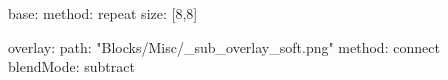 base:
  method: repeat
  size: [8,8]

overlay:
  path: "Blocks/Misc/_sub_overlay_soft.png"
  method: connect
  blendMode: subtract